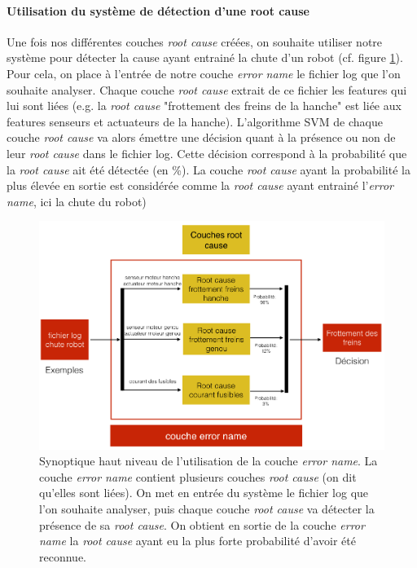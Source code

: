 \paragraph{Utilisation du système de détection d'une root cause}
Une fois nos différentes couches \emph{root cause} créées, on souhaite utiliser notre système pour détecter la cause ayant entrainé la chute d'un robot (cf. figure \ref{fig:utilisation de la couche error name}). Pour cela, on place à l'entrée de notre couche \emph{error name} le fichier log que l'on souhaite analyser. Chaque couche \emph{root cause} extrait de ce fichier les features qui lui sont liées (e.g. la \emph{root cause} "frottement des freins de la hanche" est liée aux features senseurs et actuateurs de la hanche). L'algorithme SVM de chaque couche \emph{root cause} va alors émettre une décision quant à la présence ou non de leur \emph{root cause} dans le fichier log. Cette décision correspond à la probabilité que la \emph{ root cause} ait été détectée (en \%). La couche \emph{root cause} ayant la probabilité la plus élevée en sortie est considérée comme la \emph{root cause} ayant entrainé l'\emph{error name},  ici la chute du robot) 

\begin{figure}[h]
	\centering\includegraphics[width=15cm]{images/synoptique_error.png}
	\caption[Utilisation de la couche error name]{Synoptique haut niveau de l'utilisation de la couche \emph{error name}. La couche \emph{error name} contient plusieurs couches \emph{root cause} (on dit qu'elles sont liées). On met en entrée du système le fichier log que l'on souhaite analyser, puis chaque couche \emph{root cause} va détecter la présence de sa \emph{root cause}. On obtient en sortie de la couche \emph{error name} la \emph{root cause}  ayant eu la plus forte probabilité d'avoir été reconnue.}
	\label{fig:utilisation de la couche error name}
\end{figure}

